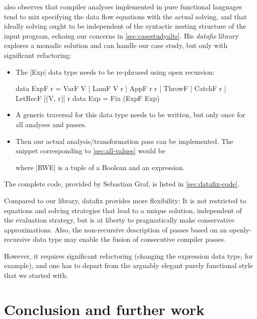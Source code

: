 \documentclass[manuscript,screen,acmsmall,nonacm]{acmart}
\begin{document}
 also observes that compiler analyses implemented in pure functional languages tend to mix specifying the data flow equations with the actual solving, and that ideally solving ought to be independent of the syntactic nesting structure of the input program, echoing our concerns in \cref{sec:casestudyalts}. His \emph{datafix} library explores a monadic solution and can handle our case study, but only with significant refactoring:
\begin{itemize}
\item The |Exp| data type needs to be re-phrased using open recursion:
\begin{code}
data ExpF r =  VarF V | LamF V r | AppF r r | ThrowF | CatchF r | LetRecF [(V, r)] r
data Exp = Fix (ExpF Exp)
\end{code}
\item A generic traversal for this data type needs to be written, but only once for all analyses and passes.
\item Then our actual analysis/transformation pass can be implemented. The snippet corresponding to \cref{sec:all-values} would be
where |RWE| is a tuple of a Boolean and an expression.
\end{itemize}
The complete code, provided by Sebastian Graf, is listed in \cref{sec:datafix-code}.

Compared to our library, datafix provides more flexibility: It is not restricted to equations and solving strategies that lead to a unique solution, independent of the evaluation strategy, but is at liberty to pragmatically make conservative approximations. Also, the non-recursive description of passes based on an openly-recursive data type may enable the fusion of consecutive compiler passes.

However, it requires significant refactoring (changing the expression data type, for example), and one has to depart from the arguably elegant purely functional style that we started with.

\section{Conclusion and further work}
\end{document}
